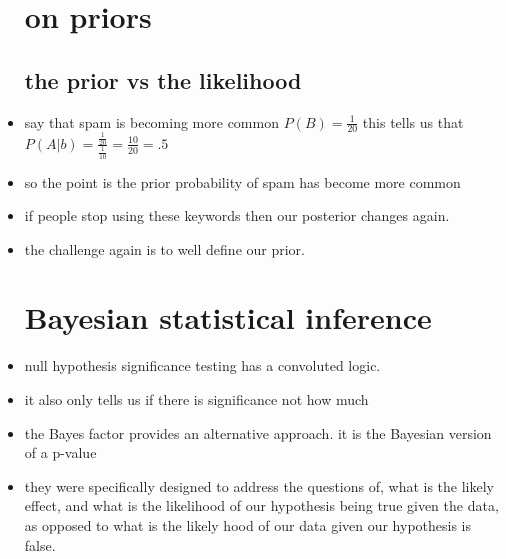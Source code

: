 \documentclass{article}
\begin{document}
\begin{itemize}
\section{on priors}
\subsection{ the prior vs the likelihood}
\item say that spam is becoming more common $P(B)=\frac{1}{20}$ this tells us that $P(A|b)=\frac{\frac{1}{20}}{\frac{1}{10}}=\frac{10}{20}=.5$
\item so the point is the prior probability of spam has become more common 
\item if people stop using these keywords then our posterior changes again. 
\item the challenge again is to well define our prior. 
\section{Bayesian statistical inference}
\item null hypothesis significance testing has a convoluted logic.
\item it also only tells us if there is significance not how much 
\item the Bayes factor provides an alternative approach. it is the Bayesian version of a p-value 
\item they were specifically designed to address the questions of, what is the likely effect, and what is the likelihood of our hypothesis being true given the data, as opposed to what is the likely hood of our data given our hypothesis is false.

\end{itemize}
\end{document}
